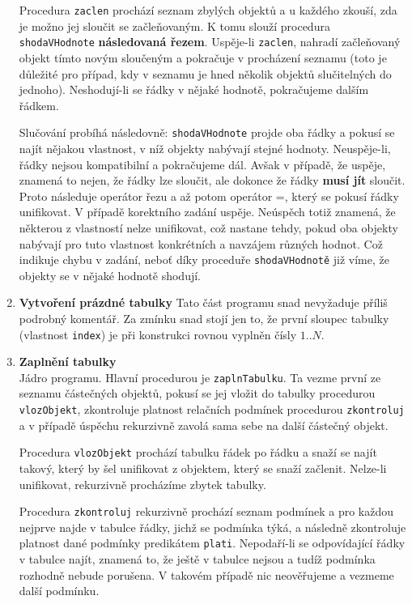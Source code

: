 \documentclass[11pt]{article} %
\begin{document}
\begin{enumerate}
Procedura \texttt{zaclen} prochází seznam zbylých objektů a u každého zkouší, zda je možno jej sloučit se začleňovaným. K tomu slouží procedura \texttt{shodaVHodnote} \textbf{následovaná řezem}. Uspěje-li \texttt{zaclen}, nahradí začleňovaný objekt tímto novým sloučeným a pokračuje v procházení seznamu (toto je důležité pro případ, kdy v seznamu je hned několik objektů slučitelných do jednoho). Neshodují-li se řádky v nějaké hodnotě, pokračujeme dalším řádkem.

Slučování probíhá následovně: \texttt{shodaVHodnote} projde oba řádky a pokusí se najít nějakou vlastnost, v níž objekty nabývají stejné hodnoty. Neuspěje-li, řádky nejsou kompatibilní a pokračujeme dál. Avšak v případě, že uspěje, znamená to nejen, že řádky lze sloučit, ale dokonce že řádky \textbf{musí jít} sloučit. Proto následuje operátor řezu a až potom operátor =, který se pokusí řádky unifikovat. V případě korektního zadání uspěje. Neúspěch totiž znamená, že některou z vlastností nelze unifikovat, což nastane tehdy, pokud oba objekty nabývají pro tuto vlastnost konkrétních a navzájem různých hodnot. Což indikuje chybu v zadání, neboť díky proceduře \texttt{shodaVHodnotě} již víme, že objekty se v nějaké hodnotě shodují.

\item \textbf{Vytvoření prázdné tabulky}
Tato část programu snad nevyžaduje příliš podrobný komentář. Za zmínku snad stojí jen to, že první sloupec tabulky (vlastnost \texttt{index}) je při konstrukci rovnou vyplněn čísly $1..N$.
\item \textbf{Zaplnění tabulky} \\
Jádro programu. Hlavní procedurou je \texttt{zaplnTabulku}. Ta vezme první ze seznamu částeč\-ných objektů, pokusí se jej vložit do tabulky procedurou \texttt{vlozObjekt}, zkontroluje platnost relačních podmínek procedurou \texttt{zkontroluj} a v případě úspěchu rekurzivně zavolá sama sebe na další částečný objekt. 

Procedura \texttt{vlozObjekt} prochází tabulku řádek po řádku a snaží se najít takový, který by šel unifikovat z objektem, který se snaží začlenit. Nelze-li unifikovat, rekurzivně procházíme zbytek tabulky.

Procedura \texttt{zkontroluj} rekurzivně prochází seznam podmínek a pro každou nejprve najde v tabulce řádky, jichž se podmínka týká, a následně zkontroluje platnost dané podmínky predikátem \texttt{plati}. Nepodaří-li se odpovídající řádky v tabulce najít, znamená to, že ještě v tabulce nejsou a tudíž podmínka rozhodně nebude porušena. V takovém případě nic neověřujeme a vezmeme další podmínku.


\end{enumerate}
\end{document}
